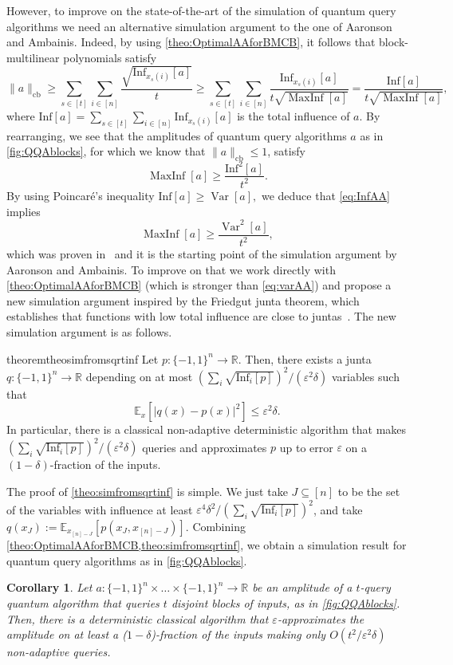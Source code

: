\documentclass[11pt]{article}
\DeclareMathOperator{\var}{Var}
\DeclareMathOperator{\maxinf}{MaxInf}
\newcommand{\E}{\mathbb{E}}
\DeclareMathOperator{\cb}{cb}
\newcommand{\norm}[1]{\|#1\|}
\newcommand{\R}{\mathbb{R}} %
\newcommand{\1}{\mathbf{1}}
\newcommand\Inf{\mathrm{Inf}}
\newcommand{\eps}{\varepsilon}
\theoremstyle{plain}
\newtheorem{corollary}[theorem]{Corollary}
\theoremstyle{definition}
\theoremstyle{remark}
\begin{document}
However, to improve on the state-of-the-art of the simulation of quantum query algorithms we need an alternative simulation argument to the one of Aaronson and Ambainis. Indeed, by using \cref{theo:OptimalAAforBMCB}, it follows that block-multilinear polynomials satisfy
\begin{equation*}
	\norm{a}_{\cb}\geq \sum_{s\in [t]}\sum_{i\in [n]}\frac{\sqrt{\Inf_{x_s(i)}[a]}}{t}\geq \sum_{s\in [t]}\sum_{i\in [n]}\frac{\Inf_{x_s(i)}[a]}{t\sqrt{\maxinf[a]}}=\frac{\Inf[a]}{t\sqrt{\maxinf[a]}},
\end{equation*} 
where $\Inf[a]=\sum_{s\in [t]}\sum_{i\in [n]}\Inf_{x_s(i)}[a]$ is the total influence of $a$. By rearranging, we see that the amplitudes of quantum query algorithms $a$ as in \cref{fig:QQAblocks}, for which we know that $\|a\|_{\cb}\leq 1$, satisfy 
\begin{equation}\label{eq:InfAA}
	\maxinf[a]\geq \frac{\Inf^2[a]}{t^2}.
\end{equation}
By using Poincaré's inequality $\Inf[a]\geq \var[a],$ we deduce that \cref{eq:InfAA} implies 
\begin{equation}\label{eq:varAA}
	\maxinf[a]\geq \frac{\var^2[a]}{t^2},
\end{equation}
which was proven in~\cite{gutierrez2023influences} and it is the starting point of the simulation argument by Aaronson and Ambainis. To improve on that we work directly with \cref{theo:OptimalAAforBMCB} (which is stronger than \cref{eq:varAA}) and propose a new simulation argument inspired by the Friedgut junta theorem, which establishes that functions with low total influence are close to juntas~\cite{friedgut1998boolean}. The new simulation argument is as follows.

\begin{restatable}{theorem}{theosimfromsqrtinf}\label{theo:simfromsqrtinf}
	Let $p:\{-1,1\}^n\to \R$. Then, there exists a junta $q:\{-1,1\}^n\to \R$ depending on at most $(\sum_i\sqrt{\Inf_i[p]})^2/(\eps^2\delta)$ variables such that $$\E_x[|q(x)-p(x)|^2]\leq \eps^2\delta.$$
	In particular, there is a classical non-adaptive deterministic algorithm that makes $(\sum_i\sqrt{\Inf_i[p]})^2/(\eps^2\delta)$ queries and approximates $p$ up to error $\eps$ on a $(1-\delta)$-fraction of the inputs. 
\end{restatable}

The proof of \cref{theo:simfromsqrtinf} is simple. We just take $J\subseteq [n]$ to be the set of the variables with influence at least $\eps^4\delta^2/(\sum_i\sqrt{\Inf_i[p]})^2$, and take $q(x_J):=\mathbb E_{x_{[n]-J}}[p(x_J,x_{[n]-J})].$ Combining \cref{theo:OptimalAAforBMCB,theo:simfromsqrtinf}, we obtain a simulation result for quantum query algorithms as in \cref{fig:QQAblocks}.
\begin{corollary}\label{cor:blockQQAsim}
    Let $a:\{-1,1\}^n\times\dots\times\{-1,1\}^n\to \R$ be an amplitude of a $t$-query quantum algorithm that queries $t$ disjoint blocks of inputs, as in \cref{fig:QQAblocks}. Then, there is a deterministic classical algorithm  that $\eps$-approximates the amplitude on at least a ($1-\delta$)-fraction of the inputs making only $O(t^2/\eps^2\delta)$ non-adaptive queries.
\end{corollary}
\end{document}
